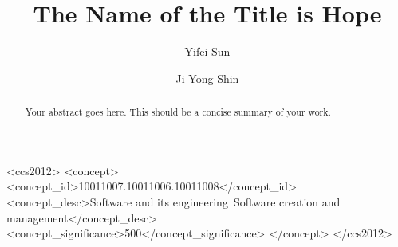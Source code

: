 \documentclass[sigplan,screen,review]{acmart}
\begin{document}
\title{The Name of the Title is Hope}

\author{Yifei Sun}

\author{Ji-Yong Shin}


\renewcommand{\shortauthors}{Sun et al.}

\begin{abstract}
  Your abstract goes here. This should be a concise summary of your work.
\end{abstract}

\begin{CCSXML}
  <ccs2012>
  <concept>
  <concept_id>10011007.10011006.10011008</concept_id>
  <concept_desc>Software and its engineering~Software creation and
  management</concept_desc>
  <concept_significance>500</concept_significance>
  </concept>
  </ccs2012>
\end{CCSXML}



\maketitle









\end{document}
